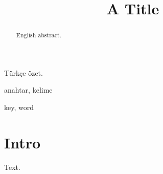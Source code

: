 \documentclass[conference]{IEEEtran}
\begin{document}
\title{A Title}
\maketitle
\begin{ozet}
T\"urk\c{c}e \"ozet.
\end{ozet}
\begin{IEEEanahtar}
anahtar, kelime
\end{IEEEanahtar}
\begin{abstract}
English abstract.
\end{abstract}
\begin{IEEEkeywords}
key, word
\end{IEEEkeywords}
\section{Intro}
Text.
\end{document}
